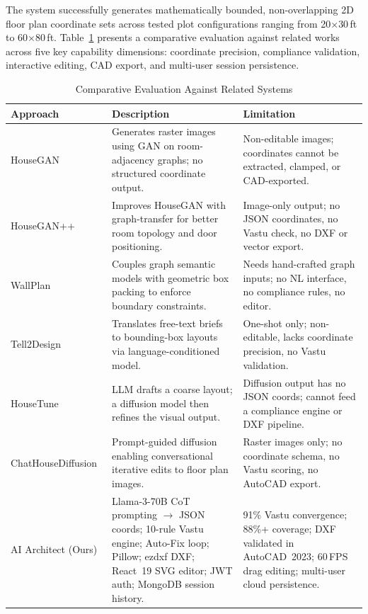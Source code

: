 \documentclass[10pt, twocolumn, letterpaper]{article}
\begin{document}
The system successfully generates mathematically bounded, non-overlapping 2D
floor plan coordinate sets across tested plot configurations ranging from
20$\times$30\,ft to 60$\times$80\,ft. Table~\ref{tab:results} presents a
comparative evaluation against related works across five key capability
dimensions: coordinate precision, compliance validation, interactive editing,
CAD export, and multi-user session persistence.

\begin{table}[!ht]
\caption{Comparative Evaluation Against Related Systems}
\label{tab:results}
\centering
\fontsize{8}{10}\selectfont
\renewcommand{\arraystretch}{1.4}
\begin{tabular}{@{}p{0.85in}p{1.1in}p{1.1in}@{}}
\toprule
\textbf{Approach} & \textbf{Description} & \textbf{Limitation} \\
\midrule

HouseGAN~\cite{houseGAN}
&
Generates raster images using GAN on room-adjacency graphs; no structured coordinate output.
&
Non-editable images; coordinates cannot be extracted, clamped, or CAD-exported. \\[4pt]

HouseGAN++~\cite{houseGANpp}
&
Improves HouseGAN with graph-transfer for better room topology and door positioning.
&
Image-only output; no JSON coordinates, no Vastu check, no DXF or vector export. \\[4pt]

WallPlan~\cite{wallplan}
&
Couples graph semantic models with geometric box packing to enforce boundary constraints.
&
Needs hand-crafted graph inputs; no NL interface, no compliance rules, no editor. \\[4pt]

Tell2Design~\cite{tell2design}
&
Translates free-text briefs to bounding-box layouts via language-conditioned model.
&
One-shot only; non-editable, lacks coordinate precision, no Vastu validation. \\[4pt]

HouseTune~\cite{housetune}
&
LLM drafts a coarse layout; a diffusion model then refines the visual output.
&
Diffusion output has no JSON coords; cannot feed a compliance engine or DXF pipeline. \\[4pt]

ChatHouseDiffusion~\cite{chathousediffusion}
&
Prompt-guided diffusion enabling conversational iterative edits to floor plan images.
&
Raster images only; no coordinate schema, no Vastu scoring, no AutoCAD export. \\[4pt]

AI Architect (Ours)
&
Llama-3-70B CoT prompting $\rightarrow$ JSON coords; 10-rule Vastu engine; Auto-Fix loop; Pillow; ezdxf DXF; React~19 SVG editor; JWT auth; MongoDB session history.
&
91\% Vastu convergence; 88\%+ coverage; DXF validated in AutoCAD~2023; 60\,FPS drag editing; multi-user cloud persistence. \\

\bottomrule
\end{tabular}
\end{table}
\end{document}
